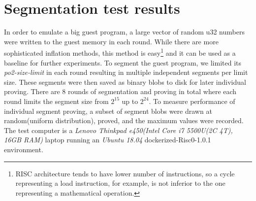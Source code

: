 \documentclass[a4paper, 10pt]{article}
\begin{document}
\section{Segmentation test results}
In order to emulate a big guest program, a large vector of random u32 numbers were written to the guest memory in each round. While there are more sophisticated inflation methods, this method is easy\footnote{RISC architecture tends to have lower number of instructions, so a cycle representing a load instruction, for example, is not inferior to the one representing a mathematical operation.} and it can be used as a baseline for further experiments. To segment the guest program, we limited its \textit{po2-size-limit} in each round resulting in multiple independent segments per limit size. These segments were then saved as binary blobs to disk for later individual proving. There are 8 rounds of segmentation and proving in total where each round limits the segment size from $2^{15}$ up to $2^{24}$. To measure performance of individual segment proving, a subset of segment blobs were drawn at random(uniform distribution), proved, and the maximum values were recorded. The test computer is a \textit{Lenovo Thinkpad e450(Intel Core i7 5500U(2C 4T), 16GB RAM)} laptop running an \textit{Ubuntu 18.04} dockerized-Risc0-1.0.1 environment.
\end{document}

